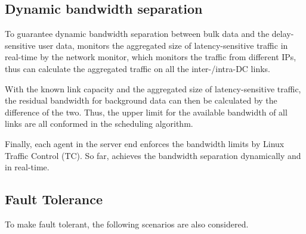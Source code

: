 %
%
%
%

\subsection{Dynamic bandwidth separation}
\label{subsec:system:separation}

To guarantee dynamic bandwidth separation between bulk data and the delay-sensitive user data, \name monitors the aggregated size of latency-sensitive traffic in real-time by the network monitor, which monitors the traffic from different IPs, thus can calculate the aggregated traffic on all the inter-/intra-DC links.

With the known link capacity and the aggregated size of latency-sensitive traffic, the residual bandwidth for background data can then be calculated by the difference of the two. Thus, the upper limit for the available bandwidth of all links are all conformed in the scheduling algorithm.

Finally, each agent in the server end enforces the bandwidth limits by Linux Traffic Control (TC). So far, \name achieves the bandwidth separation dynamically and in real-time.

\subsection{Fault Tolerance}
To make \name fault tolerant, the following scenarios are also considered.

